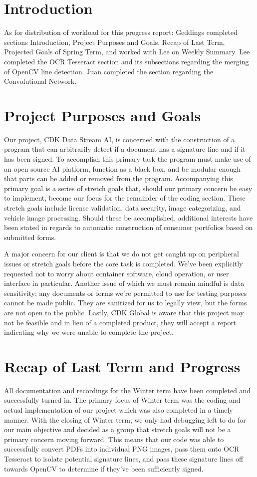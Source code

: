 \documentclass[onecolumn, draftclsnofoot,10pt, compsoc]{IEEEtran}
\begin{document}
\section{Introduction}
As for distribution of workload for this progress report: Geddings completed sections Introduction, Project Purposes and Goals, Recap of Last Term, Projected Goals of Spring Term, and worked with Lee on Weekly Summary. Lee completed the OCR Tesseract section and its subsections regarding the merging of OpenCV line detection. Juan completed the section regarding the Convolutional Network.

\section{Project Purposes and Goals}
Our project, CDK Data Stream AI, is concerned with the construction of a program that can arbitrarily detect if a document has a signature line and if it has been signed. To accomplish this primary task the program must make use of an open source AI platform, function as a black box, and be modular enough that parts can be added or removed from the program. Accompanying this primary goal is a series of stretch goals that, should our primary concern be easy to implement, become our focus for the remainder of the coding section. These stretch goals include license validation, data security, image categorizing, and vehicle image processing. Should these be accomplished, additional interests have been stated in regards to automatic construction of consumer portfolios based on submitted forms. 

A major concern for our client is that we do not get caught up on peripheral issues or stretch goals before the core task is completed. We’ve been explicitly requested not to worry about container software, cloud operation, or user interface in particular. Another issue of which we must remain mindful is data sensitivity; any documents or forms we’re permitted to use for testing purposes cannot be made public. They are sanitized for us to legally view, but the forms are not open to the public. Lastly, CDK Global is aware that this project may not be feasible and in lieu of a completed product, they will accept a report indicating why we were unable to complete the project. 

\section{Recap of Last Term and Progress}
All documentation and recordings for the Winter term have been completed and successfully turned in. The primary focus of Winter term was the coding and actual implementation of our project which was also completed in a timely manner. With the closing of Winter term, we only had debugging left to do for our main objective and decided as a group that stretch goals will not be a primary concern moving forward. This means that our code was able to successfully convert PDFs into individual PNG images, pass them onto OCR Tesseract to isolate potential signature lines, and pass these signature lines off towards OpenCV to determine if they’ve been sufficiently signed. 
\end{document}
